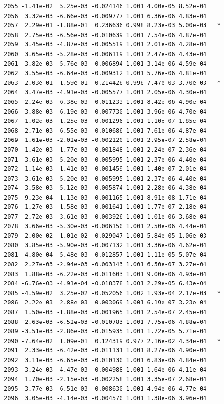 \documentclass[
  letterpaper,
  DIV=11,
  numbers=noendperiod]{scrartcl}
\begin{document}
\begin{verbatim}
2055 -1.41e-02  5.25e-03 -0.024146 1.001 4.00e-05 8.52e-04    
2056  3.32e-03 -6.66e-03 -0.009777 1.001 6.36e-06 4.83e-04    
2057  2.29e-01 -1.88e-01  0.236636 0.998 8.23e-03 5.00e-03   *
2058  2.75e-03 -6.56e-03 -0.010639 1.001 7.54e-06 4.87e-04    
2059  3.45e-03 -4.87e-03 -0.005519 1.001 2.01e-06 4.28e-04    
2060  3.65e-03 -5.28e-03 -0.006119 1.001 2.47e-06 4.43e-04    
2061  3.82e-03 -5.76e-03 -0.006894 1.001 3.14e-06 4.59e-04    
2062  3.55e-03 -6.64e-03 -0.009312 1.001 5.76e-06 4.81e-04    
2063  2.03e-01 -1.59e-01  0.214426 0.996 7.47e-03 3.70e-03   *
2064  3.47e-03 -4.91e-03 -0.005577 1.001 2.05e-06 4.30e-04    
2065  2.24e-03 -6.38e-03 -0.011233 1.001 8.42e-06 4.90e-04    
2066  3.88e-03 -6.19e-03 -0.007730 1.001 3.96e-06 4.70e-04    
2067  1.02e-03 -1.25e-03 -0.001296 1.001 1.10e-07 1.85e-04    
2068  2.71e-03 -6.55e-03 -0.010686 1.001 7.61e-06 4.87e-04    
2069  1.61e-03 -2.02e-03 -0.002120 1.001 2.95e-07 2.58e-04    
2070  1.42e-03 -1.77e-03 -0.001848 1.001 2.24e-07 2.36e-04    
2071  3.61e-03 -5.20e-03 -0.005995 1.001 2.37e-06 4.40e-04    
2072  1.14e-03 -1.41e-03 -0.001459 1.001 1.40e-07 2.01e-04    
2073  3.61e-03 -5.20e-03 -0.005995 1.001 2.37e-06 4.40e-04    
2074  3.58e-03 -5.12e-03 -0.005874 1.001 2.28e-06 4.38e-04    
2075  9.23e-04 -1.13e-03 -0.001165 1.001 8.91e-08 1.71e-04    
2076  1.27e-03 -1.58e-03 -0.001641 1.001 1.77e-07 2.18e-04    
2077  2.72e-03 -3.61e-03 -0.003926 1.001 1.01e-06 3.68e-04    
2078  3.66e-03 -5.30e-03 -0.006150 1.001 2.50e-06 4.44e-04    
2079 -2.00e-02  1.01e-02 -0.029047 1.001 5.84e-05 1.06e-03    
2080  3.85e-03 -5.90e-03 -0.007132 1.001 3.36e-06 4.62e-04    
2081  4.80e-04 -5.48e-03 -0.012857 1.001 1.11e-05 5.07e-04    
2082  2.27e-03 -2.94e-03 -0.003143 1.001 6.50e-07 3.27e-04    
2083  1.88e-03 -6.22e-03 -0.011603 1.001 9.00e-06 4.93e-04    
2084 -6.76e-03 -4.91e-04 -0.018378 1.001 2.29e-05 6.43e-04    
2085 -4.59e-02  3.25e-02 -0.052056 1.002 1.93e-04 2.17e-03   *
2086  2.22e-03 -2.88e-03 -0.003069 1.001 6.19e-07 3.23e-04    
2087  1.50e-03 -1.88e-03 -0.001965 1.001 2.54e-07 2.45e-04    
2088  2.63e-03 -6.52e-03 -0.010783 1.001 7.75e-06 4.88e-04    
2089 -3.51e-03 -2.86e-03 -0.015935 1.001 1.72e-05 5.71e-04    
2090 -7.64e-02  1.09e-01  0.124319 0.977 2.16e-02 4.34e-04   *
2091  2.33e-03 -6.42e-03 -0.011131 1.001 8.27e-06 4.90e-04    
2092  3.11e-03 -6.65e-03 -0.010130 1.001 6.83e-06 4.84e-04    
2093  3.24e-03 -4.47e-03 -0.004988 1.001 1.64e-06 4.11e-04    
2094  1.70e-03 -2.15e-03 -0.002258 1.001 3.35e-07 2.68e-04    
2095  3.77e-03 -6.51e-03 -0.008630 1.001 4.94e-06 4.77e-04    
2096  3.05e-03 -4.14e-03 -0.004570 1.001 1.38e-06 3.96e-04    

\end{verbatim}
\end{document}
